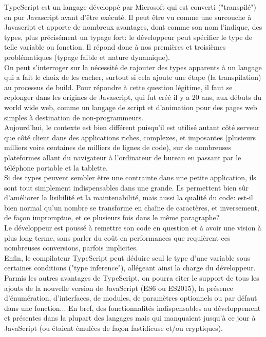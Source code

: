 \documentclass[a4paper,french,12pt]{article}
\begin{document}
	TypeScript est un langage développé par Microsoft qui est converti ("transpilé") en pur Javascript avant d'être exécuté. Il peut être vu comme une surcouche à Javascript et apporte de nombreux avantages, dont comme son nom l'indique, des types, plus précisément un typage fort: le développeur peut spécifier le type de telle variable ou fonction. Il répond donc à nos premières et troisièmes problématiques (typage faible et nature dynamique).~\\
	
On peut s'interroger sur la nécessité de rajouter des types apparents à un langage qui a fait le choix de les cacher, surtout si cela ajoute une étape (la transpilation) au processus de build. Pour répondre à cette question légitime, il faut se replonger dans les origines de Javascript, qui fut créé il y a 20 ans, aux débuts du world wide web, comme un langage de script et d'animation pour des pages web simples à destination de non-programmeurs.~\\
	Aujourd'hui, le contexte est bien différent puisqu'il est utilisé autant côté serveur que côté client dans des applications riches, complexes, et imposantes (plusieurs milliers voire centaines de milliers de lignes de code), sur de nombreuses plateformes allant du navigateur à l'ordinateur de bureau en passant par le téléphone portable et la tablette.~\\
	Si des types peuvent sembler être une contrainte dans une petite application, ils sont tout simplement indispensables dans une grande.
	Ils permettent bien sûr d'améliorer la lisibilité et la maintenabilité, 
	mais aussi la qualité du code: est-il bien normal qu'un nombre se transforme en chaîne de caractères, et inversement, de façon impromptue, et ce plusieurs fois dans le même paragraphe? ~\\
	Le développeur est poussé à remettre son code en question et à avoir une vision à plus long terme, sans parler du coût en performances que requièrent ces nombreuses conversions, parfois implicites.~\\
	 Enfin, le compilateur TypeScript peut déduire seul le type d'une variable sous certaines conditions ("type inference"), allégeant ainsi la charge du développeur.~\\
	 Parmis les autres avantages de TypeScript, on pourra citer le support de tous les ajouts de la nouvelle version de JavaScript (ES6 ou ES2015), la présence d'énumération, d'interfaces, de modules, de paramètres optionnels ou par défaut dans une fonction... En bref, des fonctionnalités indispensables au développement et présentes dans la plupart des langages mais qui manquaient jusqu'à ce jour à JavaScript (ou étaient émulées de façon fastidieuse et/ou cryptiques). 
	
\end{document}
